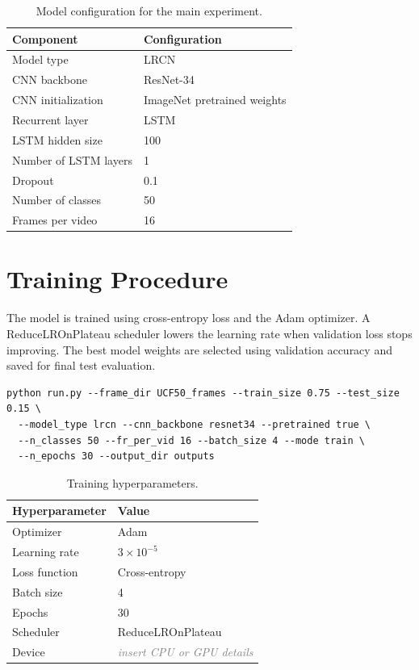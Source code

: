 \documentclass[11pt]{article}
\newcommand{\placeholder}[1]{\textcolor{gray}{\textit{#1}}}
\begin{document}
\begin{table}[h]
    \centering
    \caption{Model configuration for the main experiment.}
    \label{tab:model-config}
    \begin{tabular}{ll}
        \toprule
        Component & Configuration \\
        \midrule
        Model type & LRCN \\
        CNN backbone & ResNet-34 \\
        CNN initialization & ImageNet pretrained weights \\
        Recurrent layer & LSTM \\
        LSTM hidden size & 100 \\
        Number of LSTM layers & 1 \\
        Dropout & 0.1 \\
        Number of classes & 50 \\
        Frames per video & 16 \\
        \bottomrule
    \end{tabular}
\end{table}

\section{Training Procedure}

The model is trained using cross-entropy loss and the Adam optimizer.
A ReduceLROnPlateau scheduler lowers the learning rate when validation loss stops improving.
The best model weights are selected using validation accuracy and saved for final test evaluation.

\begin{verbatim}
python run.py --frame_dir UCF50_frames --train_size 0.75 --test_size 0.15 \
  --model_type lrcn --cnn_backbone resnet34 --pretrained true \
  --n_classes 50 --fr_per_vid 16 --batch_size 4 --mode train \
  --n_epochs 30 --output_dir outputs
\end{verbatim}

\begin{table}[h]
    \centering
    \caption{Training hyperparameters.}
    \label{tab:training-config}
    \begin{tabular}{ll}
        \toprule
        Hyperparameter & Value \\
        \midrule
        Optimizer & Adam \\
        Learning rate & $3 \times 10^{-5}$ \\
        Loss function & Cross-entropy \\
        Batch size & 4 \\
        Epochs & 30 \\
        Scheduler & ReduceLROnPlateau \\
        Device & \placeholder{insert CPU or GPU details} \\
        \bottomrule
    \end{tabular}
\end{table}
\end{document}
